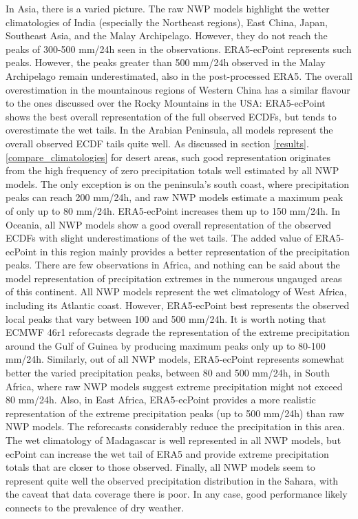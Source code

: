 \documentclass{ametsocV6.1}
\begin{document}
In Asia, there is a varied picture. The raw NWP models highlight the wetter climatologies of India (especially the Northeast regions), East China, Japan, Southeast Asia, and the Malay Archipelago. However, they do not reach the peaks of 300-500 mm/24h seen in the observations. ERA5-ecPoint represents such peaks. However, the peaks greater than 500 mm/24h observed in the Malay Archipelago remain underestimated, also in the post-processed ERA5. The overall overestimation in the mountainous regions of Western China has a similar flavour to the ones discussed over the Rocky Mountains in the USA: ERA5-ecPoint shows the best overall representation of the full observed ECDFs, but tends to overestimate the wet tails. In the Arabian Peninsula, all models represent the overall observed ECDF tails quite well. As discussed in section \ref{results}.\ref{compare_climatologies} for desert areas, such good representation originates from the high frequency of zero precipitation totals well estimated by all NWP models. The only exception is on the peninsula's south coast, where precipitation peaks can reach 200 mm/24h, and raw NWP models estimate a maximum peak of only up to 80 mm/24h. ERA5-ecPoint increases them up to 150 mm/24h. In Oceania, all NWP models show a good overall representation of the observed ECDFs with slight underestimations of the wet tails. The added value of ERA5-ecPoint in this region mainly provides a better representation of the precipitation peaks. There are few observations in Africa, and nothing can be said about the model representation of precipitation extremes in the numerous ungauged areas of this continent. All NWP models represent the wet climatology of West Africa, including its Atlantic coast. However, ERA5-ecPoint best represents the observed local peaks that vary between 100 and 500 mm/24h. It is worth noting that ECMWF 46r1 reforecasts degrade the representation of the extreme precipitation around the Gulf of Guinea by producing maximum peaks only up to 80-100 mm/24h. Similarly, out of all NWP models, ERA5-ecPoint represents somewhat better the varied precipitation peaks, between 80 and 500 mm/24h, in South Africa, where raw NWP models suggest extreme precipitation might not exceed 80 mm/24h. Also, in East Africa, ERA5-ecPoint provides a more realistic representation of the extreme precipitation peaks (up to 500 mm/24h) than raw NWP models. The reforecasts considerably reduce the precipitation in this area. The wet climatology of Madagascar is well represented in all NWP models, but ecPoint can increase the wet tail of ERA5 and provide extreme precipitation totals that are closer to those observed. Finally, all NWP models seem to represent quite well the observed precipitation distribution in the Sahara, with the caveat that data coverage there is poor. In any case, good performance likely connects to the prevalence of dry weather. 
\end{document}
